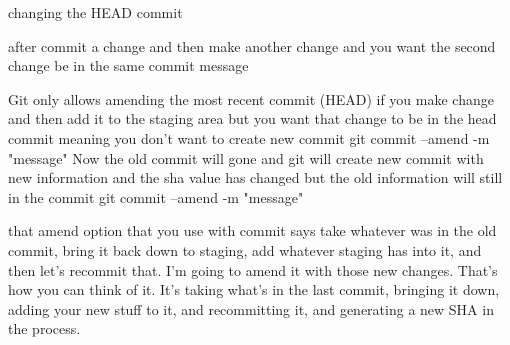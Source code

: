 changing the HEAD commit 

  after commit a change and then make another change and you want the second change be in the same commit message 

  Git only allows amending the most recent commit (HEAD)
  if you make change and then add it to the staging area 
  but you want that change to be in the head commit meaning you don't want to create new commit 
  git commit --amend -m "message"
  Now the old commit will gone and git will create new commit with new information and the sha value has changed but the old information will still in the commit  
  git commit --amend -m "message"  

  that amend option that you use with commit says take whatever was in the old commit, bring it back down to staging, add whatever staging has into it, and then let's recommit that.
  I'm going to amend it with those new changes. That's how you can think of it. It's taking what's in the last commit, bringing it down, adding your new stuff to it, and recommitting it, and generating a new SHA in the process.
